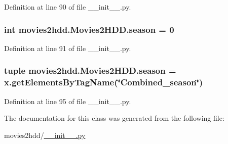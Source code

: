 Definition at line 90 of file \-\_\-\-\_\-init\-\_\-\-\_\-.\-py.

\hypertarget{classmovies2hdd_1_1_movies2_h_d_d_a948397c62c191d15a109f9867b1a83ec}{
\subsubsection[{season}]{\setlength{\rightskip}{0pt plus 5cm}int movies2hdd.\-Movies2\-H\-D\-D.\-season = 0\hspace{0.3cm}{\ttfamily [static]}}}\label{classmovies2hdd_1_1_movies2_h_d_d_a948397c62c191d15a109f9867b1a83ec}


Definition at line 91 of file \-\_\-\-\_\-init\-\_\-\-\_\-.\-py.

\hypertarget{classmovies2hdd_1_1_movies2_h_d_d_a60b03ffa3e3f0b0afbaea6b3a3351dc1}{
\subsubsection[{season}]{\setlength{\rightskip}{0pt plus 5cm}tuple movies2hdd.\-Movies2\-H\-D\-D.\-season = x.\-get\-Elements\-By\-Tag\-Name(\char`\"{}Combined\-\_\-season\char`\"{})\hspace{0.3cm}{\ttfamily [static]}}}\label{classmovies2hdd_1_1_movies2_h_d_d_a60b03ffa3e3f0b0afbaea6b3a3351dc1}


Definition at line 95 of file \-\_\-\-\_\-init\-\_\-\-\_\-.\-py.



The documentation for this class was generated from the following file\-:\begin{DoxyCompactItemize}
\item 
movies2hdd/\hyperlink{____init_____8py}{\-\_\-\-\_\-init\-\_\-\-\_\-.\-py}\end{DoxyCompactItemize}

